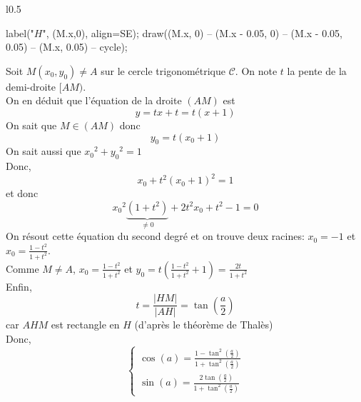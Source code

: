\begin{prv}
\begin{enumerate}
\begin{minipage}
\begin{wrapfigure}{l}{0.5\linewidth}
\begin{asy}
						label("$H$", (M.x,0), align=SE);
						draw((M.x, 0) -- (M.x - 0.05, 0) -- (M.x - 0.05, 0.05) -- (M.x, 0.05) -- cycle);
					\end{asy}
				\end{wrapfigure}
				Soit $M(x_0,y_0) \neq A$ sur le cercle trigonométrique $\mathcal{C}$. On note $t$ la pente de la demi-droite $[AM)$.\\
				On en déduit que l'équation de la droite $(AM)$ est \[
					y = tx + t = t(x+1)
				\]
				On sait que $M \in (AM)$ donc \[
					y_0 = t(x_0+1)
				\] On sait aussi que ${x_0}^2 + {y_0}^2 = 1$ \\
				Donc, \[
					x_0 + t^2(x_0+1)^2 = 1
				\] et donc \[
					{x_0}^2 \underbrace{(1+t^2)}_{\neq 0} + 2t^2x_0	+ t^2 - 1 = 0
				\] On résout cette équation du second degré et on trouve deux racines: $x_0 = -1$ et $x_0 = \frac{1-t^2}{1+t^2}$.\\
				Comme $M \neq A$, $x_0 = \frac{1-t^2}{1+t^2}$ et $y_0 = t\left( \frac{1-t^2}{1+t^2} + 1 \right) = \frac{2t}{1+t^2}$ \\
				Enfin,  \[
					t = \frac{\left| HM \right| }{\left| AH \right|} = \tan\left( \frac{a}{2} \right) 
				\] car $AHM$ est rectangle en $H$ (d'après le théorème de Thalès)\\
				Donc, \[
					\begin{cases}
						\cos(a) = \frac{1-\tan^2\left( \frac{a}{2} \right)}{1+\tan^2\left( \frac{a}{2} \right)}\\
						\sin(a) = \frac{2\tan\left( \frac{a}{2} \right)}{1+\tan^2\left( \frac{a}{2} \right) }
					\end{cases}
				\] 
			\end{minipage}
	\end{enumerate}
\end{prv}

